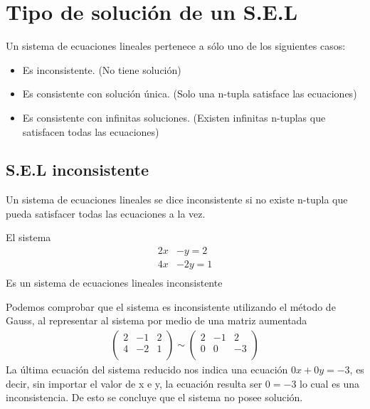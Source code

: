 \section{Tipo de solución de un S.E.L}
Un sistema de ecuaciones lineales pertenece a sólo uno de los siguientes casos:
\begin{itemize}
\item Es inconsistente. (No tiene solución)
\item Es consistente con solución única. (Solo una n-tupla satisface las ecuaciones)
\item Es consistente con infinitas soluciones. (Existen infinitas n-tuplas que satisfacen todas las ecuaciones)
\end{itemize}
\subsection{S.E.L inconsistente}
Un sistema de ecuaciones lineales se dice inconsistente si no existe n-tupla que pueda satisfacer todas las ecuaciones a la vez. 
\begin{ejemplo}
El sistema 
\begin{align*}
2x&-y=2\\
4x&-2y=1\\
\end{align*}
Es un sistema de ecuaciones lineales inconsistente 
\end{ejemplo}
Podemos comprobar que el sistema es inconsistente utilizando el método de Gauss, al representar al sistema por medio de una matriz aumentada
\begin{align*}
\left(
\begin{array}{rr|r}
2& -1 & 2\\
4& -2 & 1\\
\end{array}
\right)
\sim
\left(
\begin{array}{rr|r}
2& -1 & 2\\
0& 0 & -3\\
\end{array}
\right)
\end{align*}
La última ecuación del sistema reducido nos indica una ecuación $0x+0y=-3$, es decir, sin importar el valor de x e y, la ecuación resulta ser $0=-3$ lo cual es una inconsistencia. De esto se concluye que el sistema no posee solución.~\\

